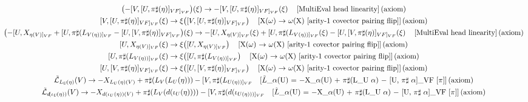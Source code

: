 \documentclass[11pt]{article}
\begin{document}
{\begin{gather*}
\left(-[V,[U,\pi\sharp(\eta)]_{VF]_{VF}}\right)\!\left(\xi\right) \to -[V,[U,\pi\sharp(\eta)]_{VF]_{VF}}\!\left(\xi\right) \quad \text{[MultiEval head linearity]\,(axiom)} \\
[V,[U,\pi\sharp(\eta)]_{VF]_{VF}}\!\left(\xi\right) \to \xi\!\left([V,[U,\pi\sharp(\eta)]_{VF]_{VF}}\right) \quad \text{[X(\ensuremath{\omega}) \ensuremath{\to} \ensuremath{\omega}(X)  [arity-1 covector pairing flip]]\,(axiom)} \\
\left(-[U,X_{\eta(V)]_{VF}} + [U,\pi\sharp(L_{V(\eta))]_{VF}} - [U,[V,\pi\sharp(\eta)]_{VF]_{VF}}\right)\!\left(\xi\right) \to -[U,X_{\eta(V)]_{VF}}\!\left(\xi\right) + [U,\pi\sharp(L_{V(\eta))]_{VF}}\!\left(\xi\right) - [U,[V,\pi\sharp(\eta)]_{VF]_{VF}}\!\left(\xi\right) \quad \text{[MultiEval head linearity]\,(axiom)} \\
[U,X_{\eta(V)]_{VF}}\!\left(\xi\right) \to \xi\!\left([U,X_{\eta(V)]_{VF}}\right) \quad \text{[X(\ensuremath{\omega}) \ensuremath{\to} \ensuremath{\omega}(X)  [arity-1 covector pairing flip]]\,(axiom)} \\
[U,\pi\sharp(L_{V(\eta))]_{VF}}\!\left(\xi\right) \to \xi\!\left([U,\pi\sharp(L_{V(\eta))]_{VF}}\right) \quad \text{[X(\ensuremath{\omega}) \ensuremath{\to} \ensuremath{\omega}(X)  [arity-1 covector pairing flip]]\,(axiom)} \\
[U,[V,\pi\sharp(\eta)]_{VF]_{VF}}\!\left(\xi\right) \to \xi\!\left([U,[V,\pi\sharp(\eta)]_{VF]_{VF}}\right) \quad \text{[X(\ensuremath{\omega}) \ensuremath{\to} \ensuremath{\omega}(X)  [arity-1 covector pairing flip]]\,(axiom)} \\
\tilde{\mathcal{L}}_{L_U\!\left(\eta\right)}\!\left(V\right) \to -X_{L_U(\eta)(V)} + \pi\sharp\!\left(L_V\!\left(L_U\!\left(\eta\right)\right)\right) - [V,\pi\sharp(L_{U(\eta))]_{VF}} \quad \text{[\ensuremath{\tilde{L}}\_\ensuremath{\alpha}(U) = \ensuremath{-}X\_{\ensuremath{\alpha}(U)} + \ensuremath{\pi}\ensuremath{\sharp}(L\_U \ensuremath{\alpha}) \ensuremath{-} [U, \ensuremath{\pi}\ensuremath{\sharp} \ensuremath{\alpha}]\_VF [\ensuremath{\pi}]]\,(axiom)} \\
\tilde{\mathcal{L}}_{d\!\left(\iota_U\!\left(\eta\right)\right)}\!\left(V\right) \to -X_{d(\iota_U(\eta))(V)} + \pi\sharp\!\left(L_V\!\left(d\!\left(\iota_U\!\left(\eta\right)\right)\right)\right) - [V,\pi\sharp(d(\iota_{U(\eta)))]_{VF}} \quad \text{[\ensuremath{\tilde{L}}\_\ensuremath{\alpha}(U) = \ensuremath{-}X\_{\ensuremath{\alpha}(U)} + \ensuremath{\pi}\ensuremath{\sharp}(L\_U \ensuremath{\alpha}) \ensuremath{-} [U, \ensuremath{\pi}\ensuremath{\sharp} \ensuremath{\alpha}]\_VF [\ensuremath{\pi}]]\,(axiom)} \\

\end{gather*}}
\end{document}
